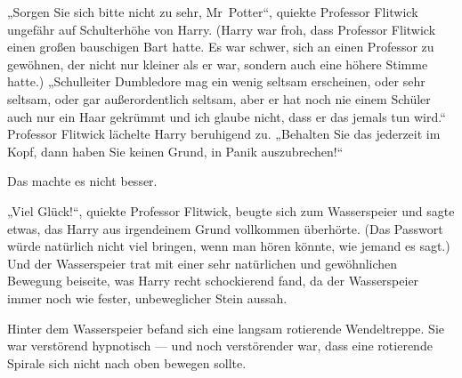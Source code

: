 „Sorgen Sie sich bitte nicht zu sehr, Mr~Potter“, quiekte Professor Flitwick ungefähr auf Schulterhöhe von Harry. (Harry war froh, dass Professor Flitwick einen großen bauschigen Bart hatte. Es war schwer, sich an einen Professor zu gewöhnen, der nicht nur kleiner als er war, sondern auch eine höhere Stimme hatte.)
„Schulleiter Dumbledore mag ein wenig seltsam erscheinen, oder sehr seltsam, oder gar außerordentlich seltsam, aber er hat noch nie einem Schüler auch nur ein Haar gekrümmt und ich glaube nicht, dass er das jemals tun wird.“ Professor Flitwick lächelte Harry beruhigend zu.
„Behalten Sie das jederzeit im Kopf, dann haben Sie keinen Grund, in Panik auszubrechen!“

Das machte es nicht besser.

„Viel Glück!“, quiekte Professor Flitwick, beugte sich zum Wasserspeier und sagte etwas, das Harry aus irgendeinem Grund vollkommen überhörte. (Das Passwort würde natürlich nicht viel bringen, wenn man hören könnte, wie jemand es sagt.) Und der Wasserspeier trat mit einer sehr natürlichen und gewöhnlichen Bewegung beiseite, was Harry recht schockierend fand, da der Wasserspeier immer noch wie fester, unbeweglicher Stein aussah.

Hinter dem Wasserspeier befand sich eine langsam rotierende Wendeltreppe. Sie war verstörend hypnotisch — und noch verstörender war, dass eine rotierende Spirale sich nicht nach oben bewegen sollte.

